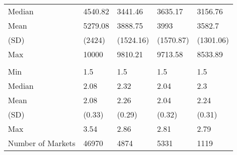 \begin{tabular}[t]{lllll}
\hspace{1em}Median & 4540.82 & 3441.46 & 3635.17 & 3156.76\\
\hspace{1em}Mean & 5279.08 & 3888.75 & 3993 & 3582.7\\
\hspace{1em}(SD) & (2424) & (1524.16) & (1570.87) & (1301.06)\\
\hspace{1em}Max & 10000 & 9810.21 & 9713.58 & 8533.89\\
\addlinespace[0.3em]
\multicolumn{5}{l}{\textbf{Market Minimum Distance}}\\
\hspace{1em}Min & 1.5 & 1.5 & 1.5 & 1.5\\
\hspace{1em}Median & 2.08 & 2.32 & 2.04 & 2.3\\
\hspace{1em}Mean & 2.08 & 2.26 & 2.04 & 2.24\\
\hspace{1em}(SD) & (0.33) & (0.29) & (0.32) & (0.31)\\
\hspace{1em}Max & 3.54 & 2.86 & 2.81 & 2.79\\
\midrule
Number of Markets & 46970 & 4874 & 5331 & 1119\\
\bottomrule
\end{tabular}
